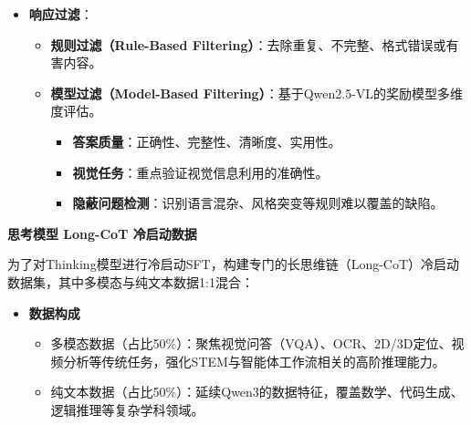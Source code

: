 \documentclass[zihao=false,fontset=windows]{ctexart}
\begin{document}
\begin{itemize}[label=\textcolor{feishuBlue}{\textbullet}]
\item \textbf{响应过滤}：
\begin{itemize}[label=\textcolor{feishuBlue}{\textbullet}]
\item \textbf{规则过滤（Rule-Based Filtering）}：去除重复、不完整、格式错误或有害内容。

\end{itemize}

\begin{itemize}[label=\textcolor{feishuBlue}{\textbullet}]
\item \textbf{模型过滤（Model-Based Filtering）}：基于Qwen2.5-VL的奖励模型多维度评估。
\begin{itemize}[label=\textcolor{feishuBlue}{\textbullet}]
\item \textbf{答案质量}：正确性、完整性、清晰度、实用性。

\end{itemize}

\begin{itemize}[label=\textcolor{feishuBlue}{\textbullet}]
\item \textbf{视觉任务}：重点验证视觉信息利用的准确性。

\end{itemize}

\begin{itemize}[label=\textcolor{feishuBlue}{\textbullet}]
\item \textbf{隐蔽问题检测}：识别语言混杂、风格突变等规则难以覆盖的缺陷。

\end{itemize}

\end{itemize}

\end{itemize}

\textcolor{feishuRed}{\textbf{思考模型 Long-CoT 冷启动数据}}\par

为了对Thinking模型进行冷启动SFT，构建专门的长思维链（Long-CoT）冷启动数据集，其中多模态与纯文本数据1:1混合：\par

\begin{itemize}[label=\textcolor{feishuBlue}{1.}]
\item \textbf{数据构成}
\begin{itemize}[label=\textcolor{feishuBlue}{\textbullet}]
\item 多模态数据（占比50\%）：聚焦视觉问答（VQA）、OCR、2D/3D定位、视频分析等传统任务，强化STEM与智能体工作流相关的高阶推理能力。

\end{itemize}

\begin{itemize}[label=\textcolor{feishuBlue}{\textbullet}]
\item 纯文本数据（占比50\%）：延续Qwen3的数据特征，覆盖数学、代码生成、逻辑推理等复杂学科领域。

\end{itemize}

\end{itemize}
\end{document}
